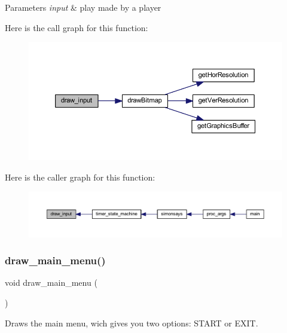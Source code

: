 \begin{DoxyParams}{Parameters}
{\em input} & play made by a player \\
\hline
\end{DoxyParams}
Here is the call graph for this function\+:\nopagebreak
\begin{figure}[H]
\begin{center}
\leavevmode
\includegraphics[width=350pt]{group___bitmap_ga556f9cfc8664aff3169e9775310a5144_cgraph}
\end{center}
\end{figure}
Here is the caller graph for this function\+:\nopagebreak
\begin{figure}[H]
\begin{center}
\leavevmode
\includegraphics[width=350pt]{group___bitmap_ga556f9cfc8664aff3169e9775310a5144_icgraph}
\end{center}
\end{figure}
\mbox{\label{group___bitmap_ga83361e027b6f0dd917305f1f82dedda3}} 
\subsubsection{\texorpdfstring{draw\+\_\+main\+\_\+menu()}{draw\_main\_menu()}}
{\footnotesize\ttfamily void draw\+\_\+main\+\_\+menu (\begin{DoxyParamCaption}{ }\end{DoxyParamCaption})}



Draws the main menu, wich gives you two options\+: S\+T\+A\+RT or E\+X\+IT. 

